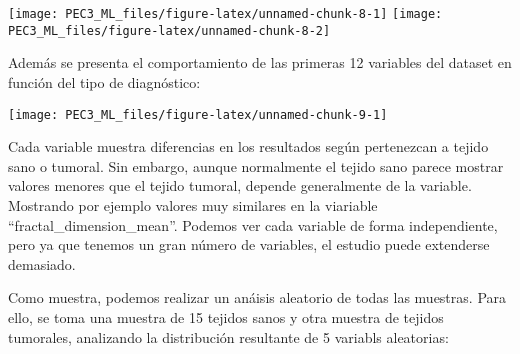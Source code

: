 \documentclass[
]{article}
\newenvironment{Shaded}{\begin{snugshade}}{\end{snugshade}}
\newcommand{\DataTypeTok}[1]{\textcolor[rgb]{0.13,0.29,0.53}{#1}}
\newcommand{\DecValTok}[1]{\textcolor[rgb]{0.00,0.00,0.81}{#1}}
\newcommand{\FloatTok}[1]{\textcolor[rgb]{0.00,0.00,0.81}{#1}}
\newcommand{\KeywordTok}[1]{\textcolor[rgb]{0.13,0.29,0.53}{\textbf{#1}}}
\newcommand{\NormalTok}[1]{#1}
\newcommand{\OperatorTok}[1]{\textcolor[rgb]{0.81,0.36,0.00}{\textbf{#1}}}
\newcommand{\StringTok}[1]{\textcolor[rgb]{0.31,0.60,0.02}{#1}}
\begin{document}
\begin{Shaded}
\end{Shaded}

\begin{center}\texttt{[image: PEC3\_ML\_files/figure-latex/unnamed-chunk-8-1]} \texttt{[image: PEC3\_ML\_files/figure-latex/unnamed-chunk-8-2]} \end{center}

Además se presenta el comportamiento de las primeras 12 variables del
dataset en función del tipo de diagnóstico:

\begin{center}\texttt{[image: PEC3\_ML\_files/figure-latex/unnamed-chunk-9-1]} \end{center}

Cada variable muestra diferencias en los resultados según pertenezcan a
tejido sano o tumoral. Sin embargo, aunque normalmente el tejido sano
parece mostrar valores menores que el tejido tumoral, depende
generalmente de la variable. Mostrando por ejemplo valores muy similares
en la viariable ``fractal\_dimension\_mean''. Podemos ver cada variable
de forma independiente, pero ya que tenemos un gran número de variables,
el estudio puede extenderse demasiado.

Como muestra, podemos realizar un anáisis aleatorio de todas las
muestras. Para ello, se toma una muestra de 15 tejidos sanos y otra
muestra de tejidos tumorales, analizando la distribución resultante de 5
variabls aleatorias:
\end{document}
